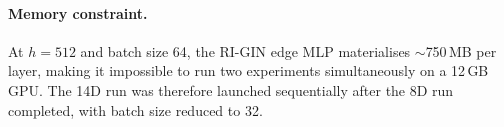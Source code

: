\paragraph{Memory constraint.}
At $h = 512$ and batch size 64, the RI-GIN edge MLP materialises $\sim$750\,MB
per layer, making it impossible to run two experiments simultaneously on a
12\,GB GPU.
The 14D run was therefore launched sequentially after the 8D run completed,
with batch size reduced to 32.
